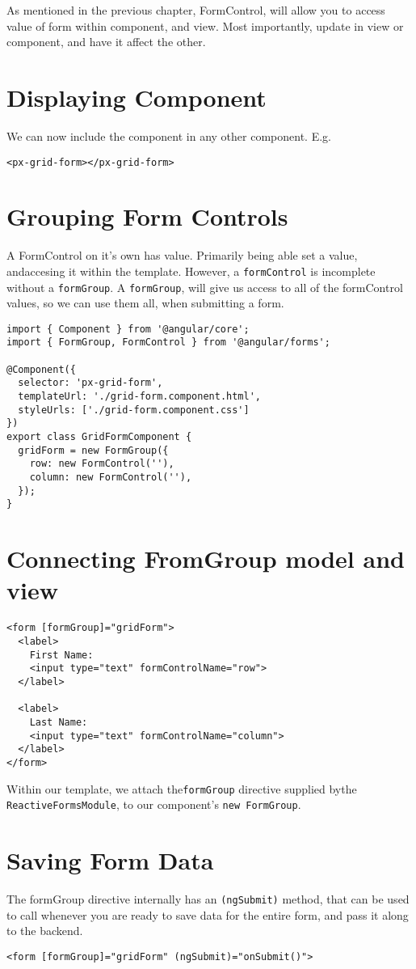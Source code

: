 As mentioned in the previous chapter, FormControl, will allow you to access value of form within component, and view. Most importantly, update in view or component, and have it affect the other. 

\section{ Displaying Component }
We can now include the component in any other component. E.g. 
\begin{lstlisting}[caption=app.component.html]
<px-grid-form></px-grid-form>  
\end{lstlisting}

\section{ Grouping Form Controls }
A FormControl on it's own has value. Primarily being able set a value, andaccesing it within the template. However, a \lstinline{formControl} is incomplete without a \lstinline{formGroup}. A \lstinline{formGroup}, will give us access to all of the formControl values, so we can use them all, when submitting a form. 

\begin{lstlisting}
import { Component } from '@angular/core';
import { FormGroup, FormControl } from '@angular/forms';
 
@Component({
  selector: 'px-grid-form',
  templateUrl: './grid-form.component.html',
  styleUrls: ['./grid-form.component.css']
})
export class GridFormComponent {
  gridForm = new FormGroup({
    row: new FormControl(''),
    column: new FormControl(''),
  });
}
\end{lstlisting}

\section{ Connecting FromGroup model and view }
\begin{lstlisting}
<form [formGroup]="gridForm">
  <label>
    First Name:
    <input type="text" formControlName="row">
  </label>

  <label>
    Last Name:
    <input type="text" formControlName="column">
  </label>
</form>
\end{lstlisting}
Within our template, we attach the\lstinline{formGroup} directive supplied bythe \lstinline{ReactiveFormsModule}, to our component's \lstinline{new FormGroup}.

\section{Saving Form Data}
The formGroup directive internally has an \lstinline{(ngSubmit)} method, that can be used to call whenever you are ready to save data for the entire form, and pass it along to the backend.
\begin{lstlisting}[caption=code-form.component.html]
  <form [formGroup]="gridForm" (ngSubmit)="onSubmit()">
\end{lstlisting}

